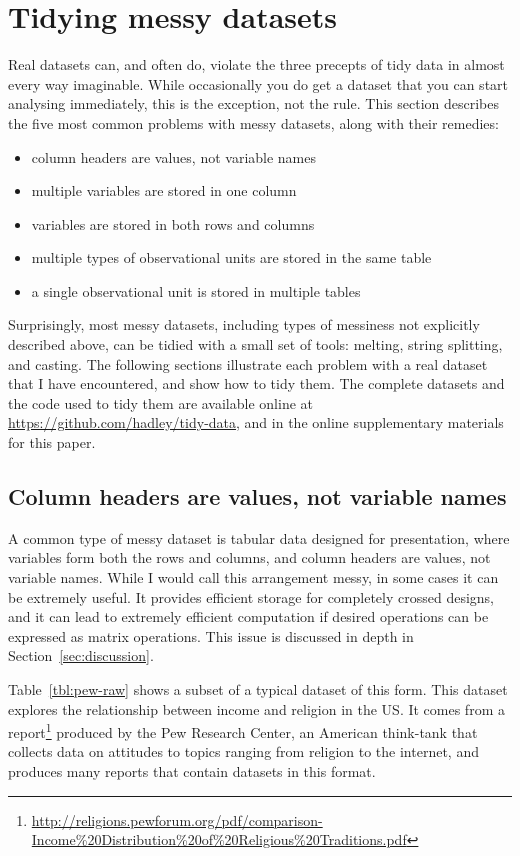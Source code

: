\documentclass[article]{jss}
\begin{document}
\section{Tidying messy datasets}
\label{sec:tidying}

Real datasets can, and often do, violate the three precepts of tidy data in almost every way imaginable. While occasionally you do get a dataset that you can start analysing immediately, this is the exception, not the rule. This section describes the five most common problems with messy datasets, along with their remedies:

\begin{itemize}
  \item column headers are values, not variable names
  \item multiple variables are stored in one column
  \item variables are stored in both rows and columns
  \item multiple types of observational units are stored in the same table
  \item a single observational unit is stored in multiple tables
\end{itemize}

Surprisingly, most messy datasets, including types of messiness not explicitly described above, can be tidied with a small set of tools: melting, string splitting, and casting. The following sections illustrate each problem with a real dataset that I have encountered, and show how to tidy them. The complete datasets and the  code used to tidy them are available online at \url{https://github.com/hadley/tidy-data}, and in the online supplementary materials for this paper.

\subsection{Column headers are values, not variable names}

A common type of messy dataset is tabular data designed for presentation, where variables form both the rows and columns, and column headers are values, not variable names. While I would call this arrangement messy, in some cases it can be extremely useful. It provides efficient storage for completely crossed designs, and it can lead to extremely efficient computation if desired operations can be expressed as matrix operations. This issue is discussed in depth in Section~\ref{sec:discussion}.

Table~\ref{tbl:pew-raw} shows a subset of a typical dataset of this form. This dataset explores the relationship between income and religion in the US. It comes from a report\footnote{\url{http://religions.pewforum.org/pdf/comparison-Income\%20Distribution\%20of\%20Religious\%20Traditions.pdf}} produced by the Pew Research Center, an American think-tank that collects data on attitudes to topics ranging from religion to the internet, and produces many reports that contain datasets in this format.
\end{document}
